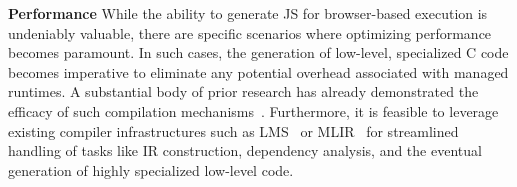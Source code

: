 \documentclass[runningheads]{llncs}
\newcommand{\lang}{Rhyme}
\begin{document}
\textbf{Performance}
While the ability to generate JS for browser-based execution is undeniably valuable,
there are specific scenarios where optimizing performance becomes paramount.
In such cases, the generation of low-level, specialized C code becomes imperative to
eliminate any potential overhead associated with managed runtimes.
A substantial body of prior research has already demonstrated the efficacy of
such compilation mechanisms~\cite{500lines,lb2,flare_osdi,sai_guannan}.
Furthermore, it is feasible to leverage existing compiler infrastructures such
as LMS~\cite{lms} or MLIR~\cite{mlir} for streamlined handling of tasks like
IR construction, dependency analysis, and the eventual generation of highly
specialized low-level code.




%
%





\end{document}
